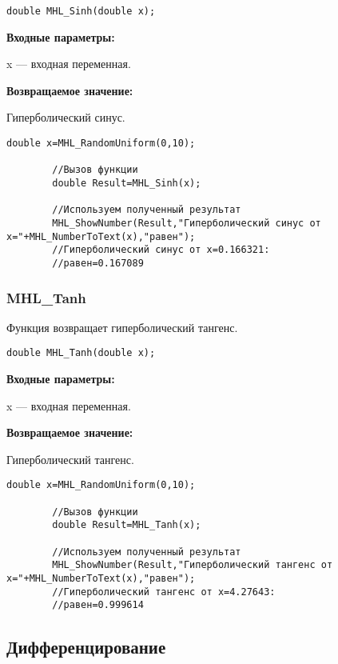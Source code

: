 \documentclass[a4paper,12pt]{article}
\begin{document}
\begin{lstlisting}[label=code_syntax_MHL_Sinh,caption=Синтаксис]
double MHL_Sinh(double x);
\end{lstlisting}

\textbf{Входные параметры:}

 x --- входная переменная.

\textbf{Возвращаемое значение:}

Гиперболический синус.


\begin{lstlisting}[label=code_use_MHL_Sinh,caption=Пример использования]
        double x=MHL_RandomUniform(0,10);

        //Вызов функции
        double Result=MHL_Sinh(x);

        //Используем полученный результат
        MHL_ShowNumber(Result,"Гиперболический синус от x="+MHL_NumberToText(x),"равен");
        //Гиперболический синус от x=0.166321:
        //равен=0.167089
\end{lstlisting}

\subsubsection{MHL\_Tanh}\label{MHL_Tanh}

Функция возвращает гиперболический тангенс.


\begin{lstlisting}[label=code_syntax_MHL_Tanh,caption=Синтаксис]
double MHL_Tanh(double x);
\end{lstlisting}

\textbf{Входные параметры:}

 x --- входная переменная.

\textbf{Возвращаемое значение:}

Гиперболический тангенс.


\begin{lstlisting}[label=code_use_MHL_Tanh,caption=Пример использования]
        double x=MHL_RandomUniform(0,10);

        //Вызов функции
        double Result=MHL_Tanh(x);

        //Используем полученный результат
        MHL_ShowNumber(Result,"Гиперболический тангенс от x="+MHL_NumberToText(x),"равен");
        //Гиперболический тангенс от x=4.27643:
        //равен=0.999614
\end{lstlisting}

\subsection{Дифференцирование}
\end{document}
